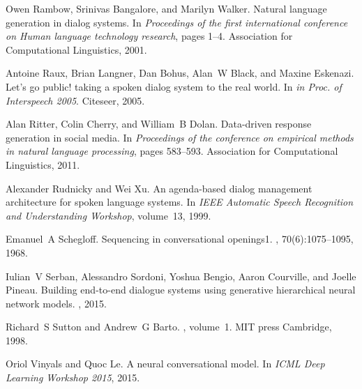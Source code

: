 \documentclass[11pt]{article}
\begin{document}
\begin{thebibliography}{}
Owen Rambow, Srinivas Bangalore, and Marilyn Walker.
\newblock Natural language generation in dialog systems.
\newblock In {\em Proceedings of the first international conference on Human
  language technology research}, pages 1--4. Association for Computational
  Linguistics, 2001.

Antoine Raux, Brian Langner, Dan Bohus, Alan~W Black, and Maxine Eskenazi.
\newblock Let’s go public! taking a spoken dialog system to the real world.
\newblock In {\em in Proc. of Interspeech 2005}. Citeseer, 2005.

Alan Ritter, Colin Cherry, and William~B Dolan.
\newblock Data-driven response generation in social media.
\newblock In {\em Proceedings of the conference on empirical methods in natural
  language processing}, pages 583--593. Association for Computational
  Linguistics, 2011.

Alexander Rudnicky and Wei Xu.
\newblock An agenda-based dialog management architecture for spoken language
  systems.
\newblock In {\em IEEE Automatic Speech Recognition and Understanding
  Workshop}, volume~13, 1999.

Emanuel~A Schegloff.
\newblock Sequencing in conversational openings1.
, 70(6):1075--1095, 1968.

Iulian~V Serban, Alessandro Sordoni, Yoshua Bengio, Aaron Courville, and Joelle
  Pineau.
\newblock Building end-to-end dialogue systems using generative hierarchical
  neural network models.
, 2015.

Richard~S Sutton and Andrew~G Barto.
, volume~1.
\newblock MIT press Cambridge, 1998.

Oriol Vinyals and Quoc Le.
\newblock A neural conversational model.
\newblock In {\em ICML Deep Learning Workshop 2015}, 2015.


\end{thebibliography}
\end{document}
